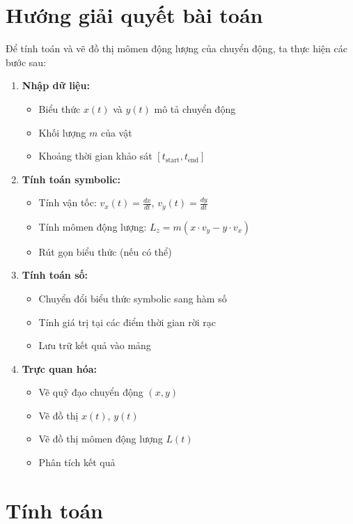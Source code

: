 \documentclass{report}
\begin{document}
\section{Hướng giải quyết bài toán}
\justifying Để tính toán và vẽ đồ thị mômen động lượng của chuyển động, ta thực hiện các bước sau:
\begin{enumerate}
    \item \textbf{Nhập dữ liệu:}
    \begin{itemize}
        \item Biểu thức $x(t)$ và $y(t)$ mô tả chuyển động
        \item Khối lượng $m$ của vật
        \item Khoảng thời gian khảo sát $[t_{\text{start}}, t_{\text{end}}]$
    \end{itemize}
    \item \textbf{Tính toán symbolic:}
    \begin{itemize}
        \item Tính vận tốc: $v_x(t) = \frac{dx}{dt}$, $v_y(t) = \frac{dy}{dt}$
        \item Tính mômen động lượng: $L_z = m(x \cdot v_y - y \cdot v_x)$
        \item Rút gọn biểu thức (nếu có thể)
    \end{itemize}
    \item \textbf{Tính toán số:}
    \begin{itemize}
        \item Chuyển đổi biểu thức symbolic sang hàm số
        \item Tính giá trị tại các điểm thời gian rời rạc
        \item Lưu trữ kết quả vào mảng
    \end{itemize}
    \item \textbf{Trực quan hóa:}
    \begin{itemize}
        \item Vẽ quỹ đạo chuyển động $(x, y)$
        \item Vẽ đồ thị $x(t)$, $y(t)$
        \item Vẽ đồ thị mômen động lượng $L(t)$
        \item Phân tích kết quả
    \end{itemize}
\end{enumerate}

\section{Tính toán}
\end{document}
